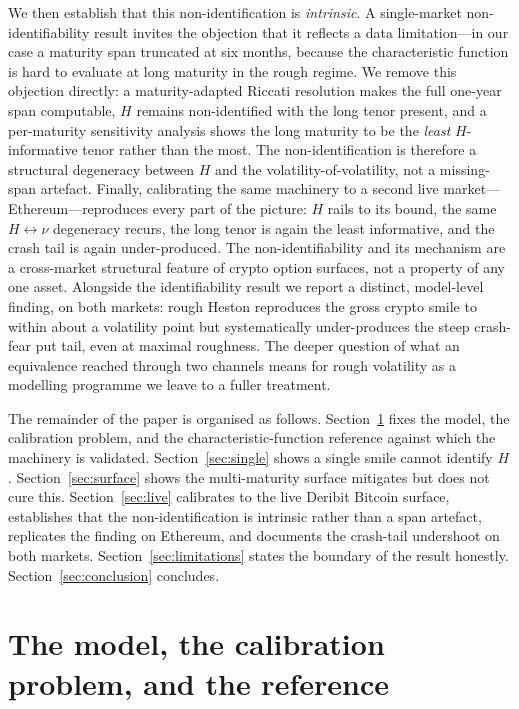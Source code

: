 \documentclass[11pt,a4paper]{article}
\numberwithin{equation}{section}
\begin{document}
We then establish that this non-identification is \emph{intrinsic}. A single-market
non-identifiability result invites the objection that it reflects a data limitation---in
our case a maturity span truncated at six months, because the characteristic function is
hard to evaluate at long maturity in the rough regime. We remove this objection directly:
a maturity-adapted Riccati resolution makes the full one-year span computable, $H$ remains
non-identified with the long tenor present, and a per-maturity sensitivity analysis shows
the long maturity to be the \emph{least} $H$-informative tenor rather than the most. The
non-identification is therefore a structural degeneracy between $H$ and the
volatility-of-volatility, not a missing-span artefact. Finally, calibrating the same
machinery to a second live market---Ethereum---reproduces every part of the picture: $H$
rails to its bound, the same $H\leftrightarrow\nu$ degeneracy recurs,
the long tenor is again the least informative, and the crash tail is again under-produced.
The non-identifiability and its mechanism are a cross-market structural feature of crypto
option surfaces, not a property of any one asset. Alongside the identifiability result we
report a distinct, model-level finding, on both markets: rough Heston reproduces the gross
crypto smile to within about a volatility point but systematically under-produces the steep
crash-fear put tail, even at maximal roughness. The deeper question of what an equivalence
reached through two channels means for rough volatility as a modelling programme we leave to
a fuller treatment.

The remainder of the paper is organised as follows.
Section~\ref{sec:setup} fixes the model, the calibration problem, and the
characteristic-function reference against which the machinery is validated.
Section~\ref{sec:single} shows a single smile cannot identify $H$.
Section~\ref{sec:surface} shows the multi-maturity surface mitigates but does not cure this.
Section~\ref{sec:live} calibrates to the live Deribit Bitcoin surface, establishes that the
non-identification is intrinsic rather than a span artefact, replicates the finding on
Ethereum, and documents the crash-tail undershoot on both markets.
Section~\ref{sec:limitations} states the boundary of the result honestly.
Section~\ref{sec:conclusion} concludes.

\section{The model, the calibration problem, and the reference}\label{sec:setup}
\end{document}
